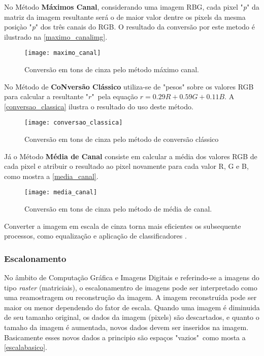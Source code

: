 No Método \textbf{Máximos Canal}, considerando uma imagem RBG, cada pixel "\textit{p}" da matriz da imagem resultante será o de maior valor dentre os pixels da mesma posiçào "\textit{p}" dos três canais do RGB. O resultado da conversão por este metodo é ilustrado na \autoref{maximo_canalimg}.
\begin{figure}[h]
	\centering
	\texttt{[image: maximo\_canal]}
	\caption{Conversão em tons de cinza pelo método máximo canal.}
	\label{maximo_canalimg}
\end{figure}	

	
No Método de \textbf{CoNversão Clássico} utiliza-se de "pesos" sobre os valores RGB para calcular a resultante "$r$"\ pela equação $r = 0.29R + 0.59G + 0.11B$. A \autoref{conversao_classica} ilustra o resultado do uso deste método. 
\begin{figure}[h]
	\centering
	\texttt{[image: conversao\_classica]}
	\caption{Conversão em tons de cinza pelo método de conversão clássico}
	\label{conversao_classica}
\end{figure}

Já o Método \textbf{Média de Canal} consiste em calcular a média dos valores RGB de cada pixel e atribuir o resultado ao pixel novamente para cada valor R, G e B, como mostra a \autoref{media_canal}.
\begin{figure}[h]
	\centering
	\texttt{[image: media\_canal]}
	\caption{Conversão em tons de cinza pelo método de média de canal.}
	\label{media_canal}
\end{figure}

Converter a imagem em escala de cinza torna mais eficientes os subsequente processos, como equalização e aplicação de classificadores \cite{drmathew_java_programming}. 




\subsubsection{Escalonamento}\label{subsubsec:escalonamento}

No âmbito de Computação Gráfica e Imagens Digitais e referindo-se a imagens do tipo \textit{raster} (matriciais), o escalonamentro de imagens pode ser interpretado como uma reamostragem ou reconstrução da imagem. A imagem reconstruída pode ser maior ou menor dependendo do fator de escala. Quando uma imagem é diminuida de seu tamanho original, os dados da imagem (pixels) são descartados, e quanto o tamaho da imagem é aumentada, novos dados devem ser inseridos na imagem.
Basicamente esses  novos dados a principio são espaços "vazios"\ como mosta a \autoref{escalabasico}. 

